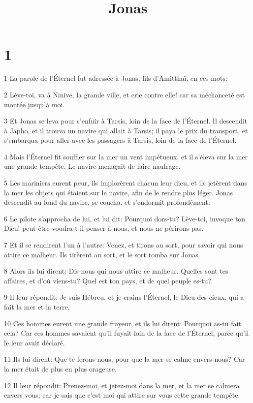 

\title{Jonas}


\chapter{1}

\par 1 La parole de l'Éternel fut adressée à Jonas, fils d'Amitthaï, en ces mots:
\par 2 Lève-toi, va à Ninive, la grande ville, et crie contre elle! car sa méchanceté est montée jusqu'à moi.
\par 3 Et Jonas se leva pour s'enfuir à Tarsis, loin de la face de l'Éternel. Il descendit à Japho, et il trouva un navire qui allait à Tarsis; il paya le prix du transport, et s'embarqua pour aller avec les passagers à Tarsis, loin de la face de l'Éternel.
\par 4 Mais l'Éternel fit souffler sur la mer un vent impétueux, et il s'éleva sur la mer une grande tempête. Le navire menaçait de faire naufrage.
\par 5 Les mariniers eurent peur, ils implorèrent chacun leur dieu, et ils jetèrent dans la mer les objets qui étaient sur le navire, afin de le rendre plus léger. Jonas descendit au fond du navire, se coucha, et s'endormit profondément.
\par 6 Le pilote s'approcha de lui, et lui dit: Pourquoi dors-tu? Lève-toi, invoque ton Dieu! peut-être voudra-t-il penser à nous, et nous ne périrons pas.
\par 7 Et il se rendirent l'un à l'autre: Venez, et tirons au sort, pour savoir qui nous attire ce malheur. Ils tirèrent au sort, et le sort tomba sur Jonas.
\par 8 Alors ils lui dirent: Dis-nous qui nous attire ce malheur. Quelles sont tes affaires, et d'où viens-tu? Quel est ton pays, et de quel peuple es-tu?
\par 9 Il leur répondit: Je suis Hébreu, et je crains l'Éternel, le Dieu des cieux, qui a fait la mer et la terre.
\par 10 Ces hommes eurent une grande frayeur, et ils lui dirent: Pourquoi as-tu fait cela? Car ces hommes savaient qu'il fuyait loin de la face de l'Éternel, parce qu'il le leur avait déclaré.
\par 11 Ils lui dirent: Que te ferons-nous, pour que la mer se calme envers nous? Car la mer était de plus en plus orageuse.
\par 12 Il leur répondit: Prenez-moi, et jetez-moi dans la mer, et la mer se calmera envers vous; car je sais que c'est moi qui attire sur vous cette grande tempête.
